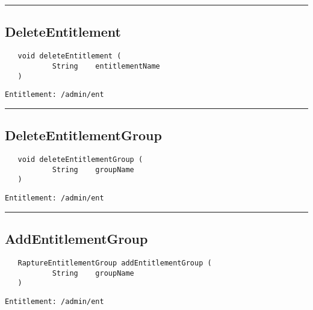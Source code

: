 \rule{12cm}{2pt}
\subsection{DeleteEntitlement}
\label{Api:DeleteEntitlement}
\begin{verbatim}
   void deleteEntitlement (
           String    entitlementName
   )
\end{verbatim}
\begin{Verbatim}[fontsize=\small, formatcom=\color{Maroon}]
  Entitlement: /admin/ent
\end{Verbatim}



\rule{12cm}{2pt}
\subsection{DeleteEntitlementGroup}
\label{Api:DeleteEntitlementGroup}
\begin{verbatim}
   void deleteEntitlementGroup (
           String    groupName
   )
\end{verbatim}
\begin{Verbatim}[fontsize=\small, formatcom=\color{Maroon}]
  Entitlement: /admin/ent
\end{Verbatim}



\rule{12cm}{2pt}
\subsection{AddEntitlementGroup}
\label{Api:AddEntitlementGroup}
\begin{verbatim}
   RaptureEntitlementGroup addEntitlementGroup (
           String    groupName
   )
\end{verbatim}
\begin{Verbatim}[fontsize=\small, formatcom=\color{Maroon}]
  Entitlement: /admin/ent
\end{Verbatim}



